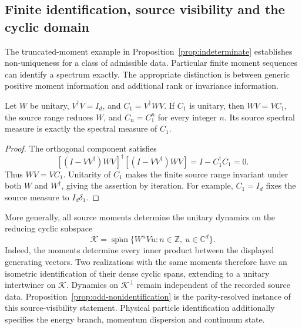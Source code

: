 \subsection{Finite identification, source visibility and the cyclic domain}
The truncated-moment example in Proposition~\ref{prop:indeterminate} establishes non-uniqueness for a class of admissible data. Particular finite moment sequences can identify a spectrum exactly. The appropriate distinction is between generic positive moment information and additional rank or invariance information.
\begin{proposition}\label{prop:unitary-first-moment}
Let $W$ be unitary, $V^\dagger V=I_d$, and $C_1=V^\dagger WV$. If $C_1$ is unitary, then $WV=VC_1$, the source range reduces $W$, and $C_n=C_1^n$ for every integer $n$. Its source spectral measure is exactly the spectral measure of $C_1$.
\end{proposition}
\begin{proof}
The orthogonal component satisfies
\[
[(I-VV^\dagger)WV]^\dagger[(I-VV^\dagger)WV]=I-C_1^\dagger C_1=0.
\]
Thus $WV=VC_1$. Unitarity of $C_1$ makes the finite source range invariant under both $W$ and $W^\dagger$, giving the assertion by iteration. For example, $C_1=I_d$ fixes the source measure to $I_d\delta_1$.
\end{proof}
More generally, all source moments determine the unitary dynamics on the reducing cyclic subspace
\[
\mathcal K=\overline{\operatorname{span}}\{W^nVu:n\in\mathbb Z,\ u\in\mathbb C^d\}.
\]
Indeed, the moments determine every inner product between the displayed generating vectors. Two realizations with the same moments therefore have an isometric identification of their dense cyclic spans, extending to a unitary intertwiner on $\mathcal K$. Dynamics on $\mathcal K^\perp$ remain independent of the recorded source data. Proposition~\ref{prop:odd-nonidentification} is the parity-resolved instance of this source-visibility statement. Physical particle identification additionally specifies the energy branch, momentum dispersion and continuum state.

